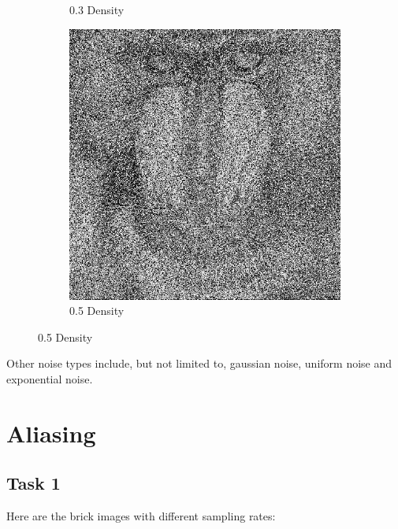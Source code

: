 \documentclass{article}
\begin{document}
\begin{figure}[h]
\begin{subfigure}[b]{0.3\textwidth}
		\caption{0.3 Density}
		\label{fig:Mandrill03.png}
	\end{subfigure}
	\begin{subfigure}[b]{0.3\textwidth}
		\includegraphics[width = \textwidth]{Mandrill05.png}
		\caption{0.5 Density}
		\label {fig:Mandrill05.png}
	\end{subfigure}
\end{figure}

Other noise types include, but not limited to, gaussian noise, uniform noise and exponential noise.

\newpage
\section*{Aliasing}
\subsection*{Task 1}
Here are the brick images with different sampling rates:\\
\end{document}
